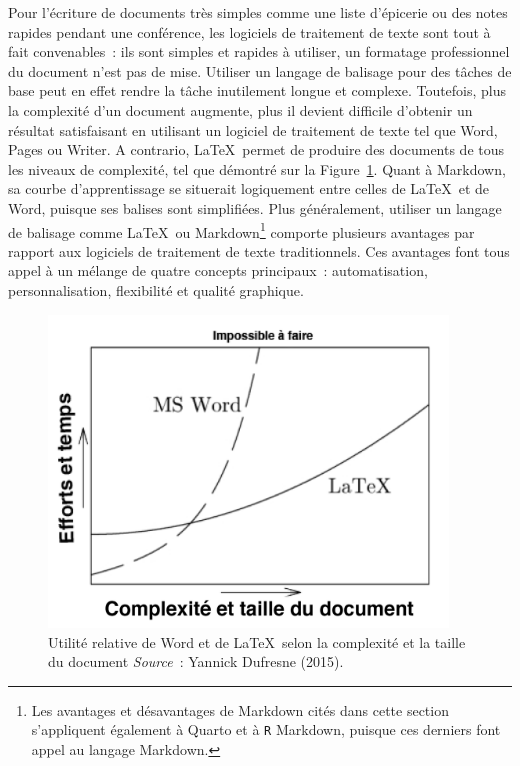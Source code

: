\documentclass[
  letterpaper,
]{scrbook}
\begin{document}
Pour l'écriture de documents très simples comme une liste d'épicerie ou
des notes rapides pendant une conférence, les logiciels de traitement de
texte sont tout à fait convenables~: ils sont simples et rapides à
utiliser, un formatage professionnel du document n'est pas de mise.
Utiliser un langage de balisage pour des tâches de base peut en effet
rendre la tâche inutilement longue et complexe. Toutefois, plus la
complexité d'un document augmente, plus il devient difficile d'obtenir
un résultat satisfaisant en utilisant un logiciel de traitement de texte
tel que Word, Pages ou Writer. A contrario, \LaTeX~permet de produire
des documents de tous les niveaux de complexité, tel que démontré sur la
Figure~\ref{fig-latex-vs-word}. Quant à Markdown, sa courbe
d'apprentissage se situerait logiquement entre celles de \LaTeX~et de
Word, puisque ses balises sont simplifiées. Plus généralement, utiliser
un langage de balisage comme \LaTeX~ou Markdown\footnote{Les avantages
  et désavantages de Markdown cités dans cette section s'appliquent
  également à Quarto et à \texttt{R} Markdown, puisque ces derniers font
  appel au langage Markdown.} comporte plusieurs avantages par rapport
aux logiciels de traitement de texte traditionnels. Ces avantages font
tous appel à un mélange de quatre concepts principaux~: automatisation,
personnalisation, flexibilité et qualité graphique.

\begin{figure}

{\centering \includegraphics[width=4.18in,height=\textheight]{images/chapitre5_word-vs-latex.png}

}

\caption{\label{fig-latex-vs-word}Utilité relative de Word et de
\LaTeX~selon la complexité et la taille du document
\newline \textit{Source}~: Yannick Dufresne (2015).}

\end{figure}
\end{document}

